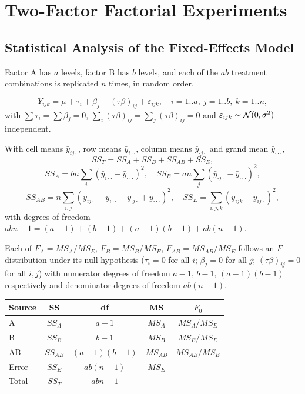 \section{Two-Factor Factorial Experiments}

\subsection{Statistical Analysis of the Fixed-Effects Model}

Factor A has $a$ levels, factor B has $b$ levels, and each of the $ab$ treatment combinations is replicated $n$ times, in random order.

\begin{definition}
\[ Y_{ijk}=\mu+\tau_i+\beta_j+(\tau\beta)_{ij}+\varepsilon_{ijk},\quad i=1..a,\ j=1..b,\ k=1..n, \]
with $\sum\tau_i=\sum\beta_j=0$, $\sum_i(\tau\beta)_{ij}=\sum_j(\tau\beta)_{ij}=0$ and $\varepsilon_{ijk}\sim\mathcal{N}(0,\sigma^2)$ independent.
\end{definition}

\begin{theorem}\label{thm:twofactor}
With cell means $\bar{y}_{ij\cdot}$, row means $\bar{y}_{i\cdot\cdot}$, column means $\bar{y}_{\cdot j\cdot}$ and grand mean $\bar{y}_{\cdot\cdot\cdot}$,
\[ SS_T=SS_A+SS_B+SS_{AB}+SS_E, \]
\[ SS_A=bn\sum_i(\bar{y}_{i\cdot\cdot}-\bar{y}_{\cdot\cdot\cdot})^2,\quad SS_B=an\sum_j(\bar{y}_{\cdot j\cdot}-\bar{y}_{\cdot\cdot\cdot})^2, \]
\[ SS_{AB}=n\sum_{i,j}(\bar{y}_{ij\cdot}-\bar{y}_{i\cdot\cdot}-\bar{y}_{\cdot j\cdot}+\bar{y}_{\cdot\cdot\cdot})^2,\quad SS_E=\sum_{i,j,k}(y_{ijk}-\bar{y}_{ij\cdot})^2, \]
with degrees of freedom $abn-1=(a-1)+(b-1)+(a-1)(b-1)+ab(n-1)$.
\end{theorem}

\begin{theorem}\label{thm:twofactor-F}
Each of $F_A=MS_A/MS_E$, $F_B=MS_B/MS_E$, $F_{AB}=MS_{AB}/MS_E$ follows an $F$ distribution under its null hypothesis ($\tau_i=0$ for all $i$; $\beta_j=0$ for all $j$; $(\tau\beta)_{ij}=0$ for all $i,j$) with numerator degrees of freedom $a-1$, $b-1$, $(a-1)(b-1)$ respectively and denominator degrees of freedom $ab(n-1)$.
\end{theorem}

\begin{center}
\begin{tabular}{lcccc}
\toprule
Source & SS & df & MS & $F_0$\\
\midrule
A & $SS_A$ & $a-1$ & $MS_A$ & $MS_A/MS_E$\\
B & $SS_B$ & $b-1$ & $MS_B$ & $MS_B/MS_E$\\
AB & $SS_{AB}$ & $(a-1)(b-1)$ & $MS_{AB}$ & $MS_{AB}/MS_E$\\
Error & $SS_E$ & $ab(n-1)$ & $MS_E$ & \\
Total & $SS_T$ & $abn-1$ & & \\
\bottomrule
\end{tabular}
\end{center}

